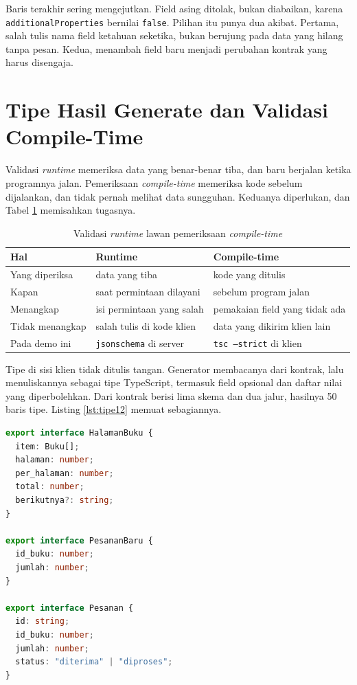 Baris terakhir sering mengejutkan. Field asing ditolak, bukan diabaikan,
karena \texttt{additionalProperties} bernilai \texttt{false}. Pilihan itu
punya dua akibat. Pertama, salah tulis nama field ketahuan seketika, bukan
berujung pada data yang hilang tanpa pesan. Kedua, menambah field baru
menjadi perubahan kontrak yang harus disengaja.

\section{Tipe Hasil Generate dan Validasi Compile-Time}

Validasi \textit{runtime} memeriksa data yang benar-benar tiba, dan baru
berjalan ketika programnya jalan. Pemeriksaan \textit{compile-time}
memeriksa kode sebelum dijalankan, dan tidak pernah melihat data sungguhan.
Keduanya diperlukan, dan Tabel \ref{tab:dua-validasi} memisahkan tugasnya.

\begin{table}[!htb]
  \centering
  \caption{Validasi \textit{runtime} lawan pemeriksaan \textit{compile-time}}
  \label{tab:dua-validasi}
  \begin{tabularx}{\textwidth}{lXX}
    \hline
    \textbf{Hal} & \textbf{Runtime} & \textbf{Compile-time} \\
    \hline
    Yang diperiksa & data yang tiba & kode yang ditulis \\
    \hline
    Kapan & saat permintaan dilayani & sebelum program jalan \\
    \hline
    Menangkap & isi permintaan yang salah & pemakaian field yang tidak ada \\
    \hline
    Tidak menangkap & salah tulis di kode klien & data yang dikirim klien lain \\
    \hline
    Pada demo ini & \texttt{jsonschema} di server & \texttt{tsc --strict} di klien \\
    \hline
  \end{tabularx}
\end{table}

Tipe di sisi klien tidak ditulis tangan. Generator membacanya dari kontrak,
lalu menuliskannya sebagai tipe TypeScript, termasuk field opsional dan
daftar nilai yang diperbolehkan. Dari kontrak berisi lima skema dan dua
jalur, hasilnya 50 baris tipe. Listing \ref{lst:tipe12} memuat sebagiannya.

\begin{lstlisting}[language=TypeScript, caption={Tipe hasil generate dari kontrak, tersedia di \berkas{sources/chapter12/tipe-katalog.ts}}, label={lst:tipe12}]
export interface HalamanBuku {
  item: Buku[];
  halaman: number;
  per_halaman: number;
  total: number;
  berikutnya?: string;
}

export interface PesananBaru {
  id_buku: number;
  jumlah: number;
}

export interface Pesanan {
  id: string;
  id_buku: number;
  jumlah: number;
  status: "diterima" | "diproses";
}
\end{lstlisting}

